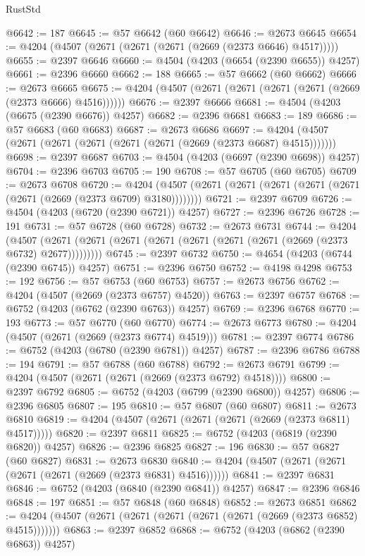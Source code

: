 \begin{lexlean}{RustStd}
\begin{coremodule}
@6642 := 187
@6645 := @57 @6642 (@60 @6642)
@6646 := @2673 @6645
@6654 := @4204 (@4507 (@2671 (@2671 (@2671 (@2669 (@2373 @6646) @4517)))))
@6655 := @2397 @6646
@6660 := @4504 (@4203 (@6654 (@2390 @6655)) @4257)
@6661 := @2396 @6660
@6662 := 188
@6665 := @57 @6662 (@60 @6662)
@6666 := @2673 @6665
@6675 := @4204 (@4507 (@2671 (@2671 (@2671 (@2671 (@2669 (@2373 @6666) @4516))))))
@6676 := @2397 @6666
@6681 := @4504 (@4203 (@6675 (@2390 @6676)) @4257)
@6682 := @2396 @6681
@6683 := 189
@6686 := @57 @6683 (@60 @6683)
@6687 := @2673 @6686
@6697 := @4204 (@4507 (@2671 (@2671 (@2671 (@2671 (@2671 (@2669 (@2373 @6687) @4515)))))))
@6698 := @2397 @6687
@6703 := @4504 (@4203 (@6697 (@2390 @6698)) @4257)
@6704 := @2396 @6703
@6705 := 190
@6708 := @57 @6705 (@60 @6705)
@6709 := @2673 @6708
@6720 := @4204 (@4507 (@2671 (@2671 (@2671 (@2671 (@2671 (@2671 (@2669 (@2373 @6709) @3180))))))))
@6721 := @2397 @6709
@6726 := @4504 (@4203 (@6720 (@2390 @6721)) @4257)
@6727 := @2396 @6726
@6728 := 191
@6731 := @57 @6728 (@60 @6728)
@6732 := @2673 @6731
@6744 := @4204
    (@4507 (@2671 (@2671 (@2671 (@2671 (@2671 (@2671 (@2671 (@2669 (@2373 @6732) @2677)))))))))
@6745 := @2397 @6732
@6750 := @4654 (@4203 (@6744 (@2390 @6745)) @4257)
@6751 := @2396 @6750
@6752 := @4198 @4298
@6753 := 192
@6756 := @57 @6753 (@60 @6753)
@6757 := @2673 @6756
@6762 := @4204 (@4507 (@2669 (@2373 @6757) @4520))
@6763 := @2397 @6757
@6768 := @6752 (@4203 (@6762 (@2390 @6763)) @4257)
@6769 := @2396 @6768
@6770 := 193
@6773 := @57 @6770 (@60 @6770)
@6774 := @2673 @6773
@6780 := @4204 (@4507 (@2671 (@2669 (@2373 @6774) @4519)))
@6781 := @2397 @6774
@6786 := @6752 (@4203 (@6780 (@2390 @6781)) @4257)
@6787 := @2396 @6786
@6788 := 194
@6791 := @57 @6788 (@60 @6788)
@6792 := @2673 @6791
@6799 := @4204 (@4507 (@2671 (@2671 (@2669 (@2373 @6792) @4518))))
@6800 := @2397 @6792
@6805 := @6752 (@4203 (@6799 (@2390 @6800)) @4257)
@6806 := @2396 @6805
@6807 := 195
@6810 := @57 @6807 (@60 @6807)
@6811 := @2673 @6810
@6819 := @4204 (@4507 (@2671 (@2671 (@2671 (@2669 (@2373 @6811) @4517)))))
@6820 := @2397 @6811
@6825 := @6752 (@4203 (@6819 (@2390 @6820)) @4257)
@6826 := @2396 @6825
@6827 := 196
@6830 := @57 @6827 (@60 @6827)
@6831 := @2673 @6830
@6840 := @4204 (@4507 (@2671 (@2671 (@2671 (@2671 (@2669 (@2373 @6831) @4516))))))
@6841 := @2397 @6831
@6846 := @6752 (@4203 (@6840 (@2390 @6841)) @4257)
@6847 := @2396 @6846
@6848 := 197
@6851 := @57 @6848 (@60 @6848)
@6852 := @2673 @6851
@6862 := @4204 (@4507 (@2671 (@2671 (@2671 (@2671 (@2671 (@2669 (@2373 @6852) @4515)))))))
@6863 := @2397 @6852
@6868 := @6752 (@4203 (@6862 (@2390 @6863)) @4257)

\end{coremodule}
\end{lexlean}
